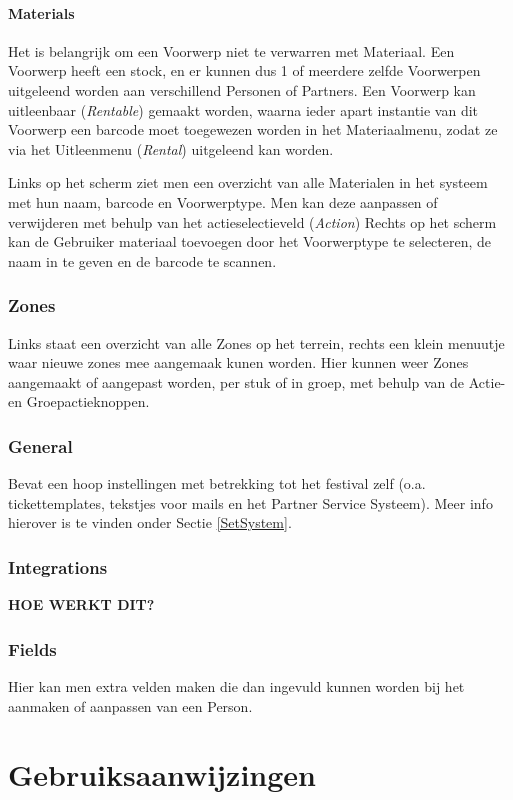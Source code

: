 \documentclass[]{memoir}
\begin{document}
\subsubsection{Materials} \label{Materials}
Het is belangrijk om een Voorwerp niet te verwarren met Materiaal. Een Voorwerp heeft een stock, en er kunnen dus 1 of meerdere zelfde Voorwerpen uitgeleend worden aan verschillend Personen of Partners. Een Voorwerp kan uitleenbaar (\textsl{Rentable}) gemaakt worden, waarna ieder apart instantie van dit Voorwerp een barcode moet toegewezen worden in het Materiaalmenu, zodat ze via het Uitleenmenu (\textsl{Rental}) uitgeleend kan worden.

Links op het scherm ziet men een overzicht van alle Materialen in het systeem met hun naam, barcode en Voorwerptype. Men kan deze aanpassen of verwijderen met behulp van het actieselectieveld (\textsl{Action})
Rechts op het scherm kan de Gebruiker materiaal toevoegen door het Voorwerptype te selecteren, de naam in te geven en de barcode te scannen.
\subsection{Zones} \label{Zones}
Links staat een overzicht van alle Zones op het terrein, rechts een klein menuutje waar nieuwe zones mee aangemaak kunen worden. Hier kunnen weer Zones aangemaakt of aangepast worden, per stuk of in groep, met behulp van de Actie- en Groepactieknoppen.

\subsection{General} \label{General}
Bevat een hoop instellingen met betrekking tot het festival zelf (o.a. tickettemplates, tekstjes voor mails en het Partner Service Systeem). Meer info hierover is te vinden onder Sectie \ref{SetSystem}.

\subsection{Integrations} \label{Integrations}
\textbf{HOE WERKT DIT?}

\subsection{Fields} \label{Fields}
Hier kan men extra velden maken die dan ingevuld kunnen worden bij het aanmaken of aanpassen van een Person.

\chapter{Gebruiksaanwijzingen} \label{Instructions}
\end{document}
